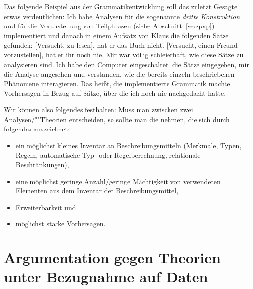 Das folgende Beispiel aus der Grammatikentwicklung soll das zuletzt Gesagte etwas verdeutlichen:
Ich habe Analysen für die sogenannte \emph{dritte Konstruktion} und für die Voranstellung von Teilphrasen
(siehe Abschnitt~\ref{sec-pvp}) implementiert und 
danach in einem Aufsatz von Klaus \citet[27]{Netter91} die folgenden Sätze gefunden:
\eal
\ex {}[Versucht, zu lesen], hat er das Buch nicht.
\ex {}[Versucht, einen Freund vorzustellen], hat er ihr noch nie.
\zl
Mir war völlig schleierhaft, wie diese Sätze zu analysieren sind. Ich habe den Computer eingeschaltet,
die Sätze eingegeben, mir die Analyse angesehen und verstanden, wie die bereits einzeln beschriebenen
Phänomene interagieren. Das heißt, die implementierte Grammatik machte Vorhersagen in Bezug auf
Sätze, über die ich noch nie nachgedacht hatte.

Wir können also folgendes festhalten:
Muss man zwischen zwei Analysen/""Theorien entscheiden, so sollte man die nehmen, die sich durch folgendes
auszeichnet:
\begin{itemize}
\item ein möglichst kleines Inventar an Beschreibungsmitteln (Merkmale, Typen, Regeln, 
      automatische Typ- oder Regelberechnung, relationale Beschränkungen),
\item eine möglichst geringe Anzahl/geringe Mächtigkeit von verwendeten Elementen 
      aus dem Inventar der Beschreibungsmittel,
\item Erweiterbarkeit und
\item möglichst starke Vorhersagen.
\end{itemize}
\enlargethispage{5pt}

\section{Argumentation gegen Theorien unter Bezugnahme auf Daten}

